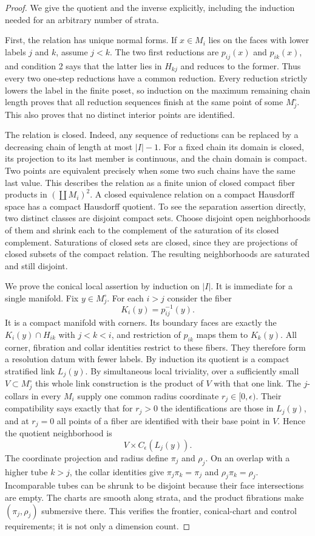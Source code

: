 \begin{proof}
We give the quotient and the inverse explicitly, including the
induction needed for an arbitrary number of strata.

First, the relation has unique normal forms. If $x\in M_i$ lies on
the faces with lower labels $j$ and $k$, assume $j<k$. The two
first reductions are $p_{ij}(x)$ and $p_{ik}(x)$, and condition 2
says that the latter lies in $H_{kj}$ and reduces to the former.
Thus every two one-step reductions have a common reduction.
Every reduction strictly lowers the label in the finite poset,
so induction on the maximum remaining chain length proves that all
reduction sequences finish at the same point of some $M_j^\circ$.
This also proves that no distinct interior points are identified.

The relation is closed. Indeed, any sequence of reductions can
be replaced by a decreasing chain of length at most $|I|-1$.
For a fixed chain its domain is closed, its projection to its last
member is continuous, and the chain domain is compact.
Two points are equivalent precisely when some two such chains
have the same last value. This describes the relation as a finite
union of closed compact fiber products in
$(\coprod M_i)^2$. A closed equivalence relation on a compact
Hausdorff space has a compact Hausdorff quotient. To see the
separation assertion directly, two distinct classes are disjoint
compact sets. Choose disjoint open neighborhoods of them and
shrink each to the complement of the saturation of its closed
complement. Saturations of closed sets are closed, since they are
projections of closed subsets of the compact relation. The resulting
neighborhoods are saturated and still disjoint.

We prove the conical local assertion by induction on $|I|$.
It is immediate for a single manifold. Fix $y\in M_j^\circ$.
For each $i>j$ consider the fiber
\[
 K_i(y)=p_{ij}^{-1}(y).
\]
It is a compact manifold with corners. Its boundary faces are
exactly the $K_i(y)\cap H_{ik}$ with $j<k<i$, and restriction
of $p_{ik}$ maps them to $K_k(y)$.
All corner, fibration and collar identities restrict to these
fibers. They therefore form a resolution datum with fewer labels.
By induction its quotient is a compact stratified link $L_j(y)$.
By simultaneous local triviality, over a sufficiently small
$V\subset M_j^\circ$ this whole link construction is the product
of $V$ with that one link. The $j$-collars in every $M_i$ supply
one common radius coordinate $r_j\in[0,\epsilon)$. Their
compatibility says exactly that for $r_j>0$ the identifications
are those in $L_j(y)$, and at $r_j=0$ all points of a fiber are
identified with their base point in $V$. Hence the quotient
neighborhood is
\[
 V\times C_{\epsilon}(L_j(y)).
\]
The coordinate projection and radius define $\pi_j$ and $\rho_j$.
On an overlap with a higher tube $k>j$, the collar identities give
$\pi_j\pi_k=\pi_j$ and $\rho_j\pi_k=\rho_j$.
Incomparable tubes can be shrunk to be disjoint because their
face intersections are empty. The charts are smooth along strata,
and the product fibrations make $(\pi_j,\rho_j)$ submersive there.
This verifies the frontier, conical-chart and control requirements;
it is not only a dimension count.


\end{proof}
